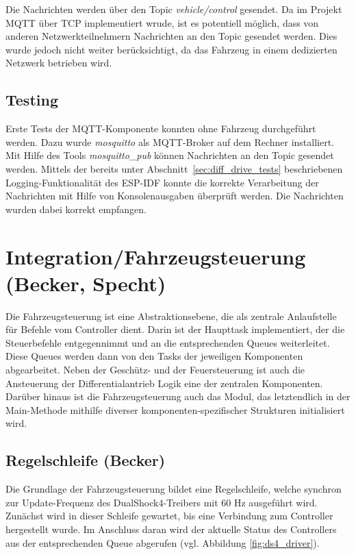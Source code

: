 Die Nachrichten werden über den Topic \textit{vehicle/control} gesendet. Da im Projekt MQTT über TCP implementiert wrude, ist es potentiell möglich, dass von anderen Netzwerkteilnehmern Nachrichten an den Topic gesendet werden. Dies wurde jedoch nicht weiter berücksichtigt, da das Fahrzeug in einem dedizierten Netzwerk betrieben wird. \newline

\subsection{Testing}

Erste Tests der MQTT-Komponente konnten ohne Fahrzeug durchgeführt werden. Dazu wurde \textit{mosquitto} als MQTT-Broker auf dem Rechner installiert. Mit Hilfe des Tools \textit{mosquitto\_pub} können Nachrichten an den Topic gesendet werden. Mittels der bereits unter Abschnitt~\ref{sec:diff_drive_tests} beschriebenen Logging-Funktionalität des ESP-IDF konnte die korrekte Verarbeitung der Nachrichten mit Hilfe von Konsolenausgaben überprüft werden. Die Nachrichten wurden dabei korrekt empfangen.

\section{Integration/Fahrzeugsteuerung (Becker, Specht) \label{sec:esp32_integration}}

Die Fahrzeugsteuerung ist eine Abstraktionsebene, die als zentrale Anlaufstelle für Befehle vom Controller dient. Darin ist der Haupttask implementiert, der die Steuerbefehle entgegennimmt und an die entsprechenden Queues weiterleitet. Diese Queues werden dann von den Tasks der jeweiligen Komponenten abgearbeitet. Neben der Geschütz- und der Feuersteuerung ist auch die Ansteuerung der Differentialantrieb Logik eine der zentralen Komponenten. Darüber hinaus ist die Fahrzeugsteuerung auch das Modul, das letztendlich in der Main-Methode mithilfe diverser komponenten-spezifischer Strukturen initialisiert wird. \newline

\subsection{Regelschleife (Becker)} \label{sec:esp32_control_loop}

Die Grundlage der Fahrzeugsteuerung bildet eine Regelschleife, welche synchron zur Update-Frequenz des DualShock4-Treibers mit 60 Hz ausgeführt wird. 
Zunächst wird in dieser Schleife gewartet, bis eine Verbindung zum Controller hergestellt wurde.
Im Anschluss daran wird der aktuelle Status des Controllers aus der entsprechenden Queue abgerufen (vgl. Abbildung \ref{fig:ds4_driver}).


